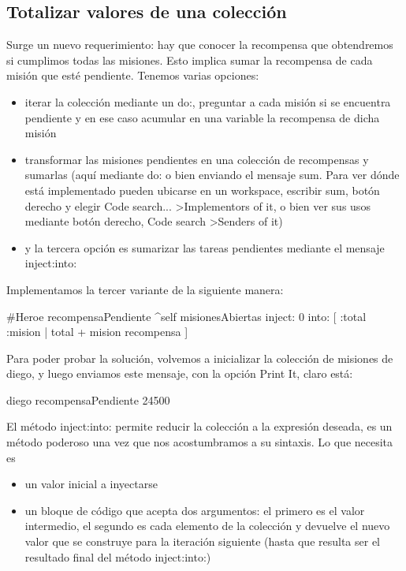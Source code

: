 \documentclass[a4paper,12pt]{book}
\begin{document}
\subsection{Totalizar valores de una colección}
Surge un nuevo requerimiento: hay que conocer la recompensa que obtendremos si cumplimos todas las misiones.
Esto implica sumar la recompensa de cada misión que esté pendiente. Tenemos varias opciones:
\\
\begin{itemize}
 \item iterar la colección mediante un do:, preguntar a cada misión si se encuentra pendiente y en ese caso
 acumular en una variable la recompensa de dicha misión
 \item transformar las misiones pendientes en una colección de recompensas y sumarlas (aquí mediante do: o 
 bien enviando el mensaje sum. Para ver dónde está implementado pueden ubicarse en un workspace, escribir sum, 
 botón derecho y elegir Code search... \textgreater Implementors of it, o bien ver sus usos mediante botón derecho,
 Code search \textgreater Senders of it)
 \item y la tercera opción es sumarizar las tareas pendientes mediante el mensaje inject:into:
\end{itemize}

Implementamos la tercer variante de la siguiente manera:

\begin{code}
#Heroe
recompensaPendiente
   ^self misionesAbiertas 
         inject: 0 
         into: [ :total :mision | total + mision recompensa ]
\end{code}

\vspace{\baselineskip}
Para poder probar la solución, volvemos a inicializar la colección de misiones de diego, y luego
enviamos este mensaje, con la opción Print It, claro está:

\begin{code}
diego recompensaPendiente
  24500
\end{code}

\vspace{\baselineskip}
El método inject:into: permite reducir la colección a la expresión deseada, es un método poderoso una vez que
nos acostumbramos a su sintaxis. Lo que necesita es

\begin{itemize}
 \item un valor inicial a inyectarse 
 \item un bloque de código que acepta dos argumentos: el primero es el valor intermedio, el segundo es
 cada elemento de la colección y devuelve el nuevo valor que se construye para la iteración siguiente
 (hasta que resulta ser el resultado final del método inject:into:)
\end{itemize}
\end{document}
